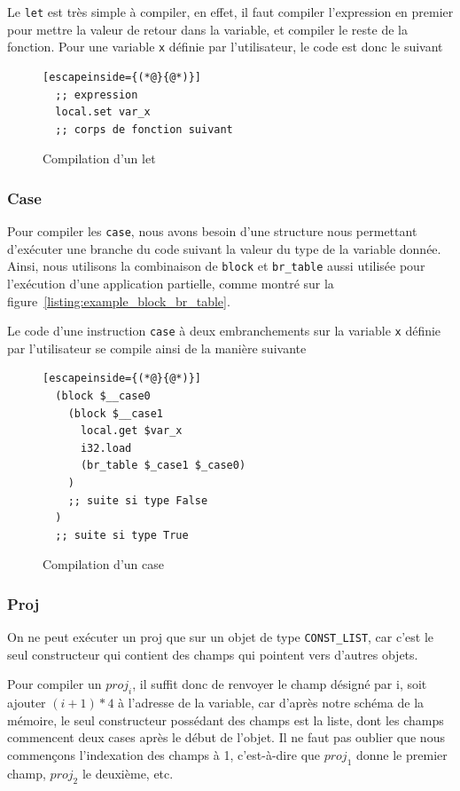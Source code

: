 \documentclass{rapportECL}
\begin{document}
Le \verb|let| est très simple à compiler, en effet, il faut compiler l'expression en premier pour mettre la valeur de retour 
dans la variable, et compiler le reste de la fonction. Pour une variable \verb|x| définie par l'utilisateur, le code est donc le suivant

\begin{figure}[H]
	\begin{lstlisting}[escapeinside={(*@}{@*)}]
  ;; expression
  local.set var_x
  ;; corps de fonction suivant
	\end{lstlisting}
	\caption{Compilation d'un let}
	\label{listing:compile_let}
\end{figure}


\subsubsection{Case}

Pour compiler les \verb|case|, nous avons besoin d'une structure nous permettant d'exécuter une branche du code suivant la valeur du 
type de la variable donnée. Ainsi, nous utilisons la combinaison de \verb|block| et \verb|br_table| aussi utilisée pour l'exécution
d'une application partielle, comme montré sur la figure~\ref{listing:example_block_br_table}.

Le code d'une instruction \verb|case| à deux embranchements sur la variable \verb|x| définie par l'utilisateur 
se compile ainsi de la manière suivante


\begin{figure}[H]
	\begin{lstlisting}[escapeinside={(*@}{@*)}]
  (block $__case0
    (block $__case1
      local.get $var_x
      i32.load
      (br_table $_case1 $_case0)
	)
    ;; suite si type False
  )
  ;; suite si type True
	\end{lstlisting}
	\caption{Compilation d'un case}
	\label{listing:compile_case}
\end{figure}

\subsubsection{Proj}

On ne peut exécuter un proj que sur un objet de type \verb|CONST_LIST|, car c'est le seul constructeur qui contient des champs qui
pointent vers d'autres objets.

Pour compiler un $proj_i$, il suffit donc de renvoyer le champ désigné par i, soit ajouter $(i + 1)*4$ à l'adresse de la variable, car
d'après notre schéma de la mémoire, le seul constructeur possédant des champs est la liste, dont les champs commencent deux cases 
après le début de l'objet.
Il ne faut pas oublier que nous commençons l'indexation des champs à 1, c'est-à-dire que $proj_1$ donne le premier champ, 
$proj_2$ le deuxième, etc.
\end{document}
